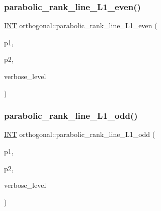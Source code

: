 \subsubsection{\texorpdfstring{parabolic\+\_\+rank\+\_\+line\+\_\+\+L1\+\_\+even()}{parabolic\_rank\_line\_L1\_even()}}
{\footnotesize\ttfamily \mbox{\hyperlink{galois_8h_a09fddde158a3a20bd2dcadb609de11dc}{I\+NT}} orthogonal\+::parabolic\+\_\+rank\+\_\+line\+\_\+\+L1\+\_\+even (\begin{DoxyParamCaption}\item[{\mbox{\hyperlink{galois_8h_a09fddde158a3a20bd2dcadb609de11dc}{I\+NT}}}]{p1,  }\item[{\mbox{\hyperlink{galois_8h_a09fddde158a3a20bd2dcadb609de11dc}{I\+NT}}}]{p2,  }\item[{\mbox{\hyperlink{galois_8h_a09fddde158a3a20bd2dcadb609de11dc}{I\+NT}}}]{verbose\+\_\+level }\end{DoxyParamCaption})}

\mbox{\label{classorthogonal_aab93abadf848b0a5d72b367f155cd7e4}} 
\subsubsection{\texorpdfstring{parabolic\+\_\+rank\+\_\+line\+\_\+\+L1\+\_\+odd()}{parabolic\_rank\_line\_L1\_odd()}}
{\footnotesize\ttfamily \mbox{\hyperlink{galois_8h_a09fddde158a3a20bd2dcadb609de11dc}{I\+NT}} orthogonal\+::parabolic\+\_\+rank\+\_\+line\+\_\+\+L1\+\_\+odd (\begin{DoxyParamCaption}\item[{\mbox{\hyperlink{galois_8h_a09fddde158a3a20bd2dcadb609de11dc}{I\+NT}}}]{p1,  }\item[{\mbox{\hyperlink{galois_8h_a09fddde158a3a20bd2dcadb609de11dc}{I\+NT}}}]{p2,  }\item[{\mbox{\hyperlink{galois_8h_a09fddde158a3a20bd2dcadb609de11dc}{I\+NT}}}]{verbose\+\_\+level }\end{DoxyParamCaption})}

\mbox{\label{classorthogonal_ad884e741520104066da699b1133deeb0}} 
